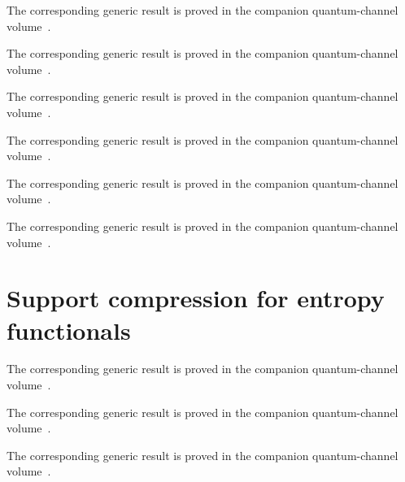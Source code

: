 The corresponding generic result is proved in the companion quantum-channel volume~\cite[``Operator-Schmidt rank under local isometries'']{QICLean2026Blueprint}.



The corresponding generic result is proved in the companion quantum-channel volume~\cite[``Support of a bipartite positive operator'']{QICLean2026Blueprint}.



The corresponding generic result is proved in the companion quantum-channel volume~\cite[``Compression to both marginal supports'']{QICLean2026Blueprint}.



The corresponding generic result is proved in the companion quantum-channel volume~\cite[``Partial traces under product isometries'']{QICLean2026Blueprint}.



The corresponding generic result is proved in the companion quantum-channel volume~\cite[``Faithful marginals after simultaneous support compression'']{QICLean2026Blueprint}.



The corresponding generic result is proved in the companion quantum-channel volume~\cite[``Channel of a faithful bipartite marginal'']{QICLean2026Blueprint}.


\section{Support compression for entropy functionals}



The corresponding generic result is proved in the companion quantum-channel volume~\cite[``Isometric conjugation into a larger matrix algebra'']{QICLean2026Blueprint}.



The corresponding generic result is proved in the companion quantum-channel volume~\cite[``Functional calculus under rectangular isometric conjugation'']{QICLean2026Blueprint}.



The corresponding generic result is proved in the companion quantum-channel volume~\cite[``Trace preservation under isometric inclusion'']{QICLean2026Blueprint}.



